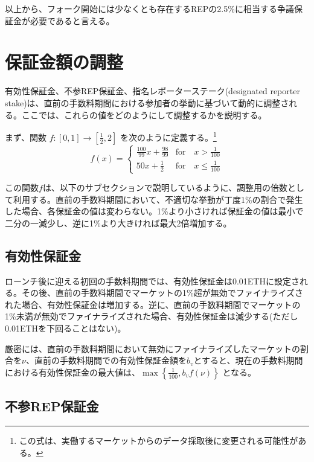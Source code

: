\documentclass[floatfix,reprint,nofootinbib,amsmath,amssymb,epsfig,pre,floats,letterpaper,groupedaffiliation]{revtex4-1}
\newcommand{\beq}{\begin{equation}}
\newcommand{\eeq}{\end{equation}}
\theoremstyle{definition}
\theoremstyle{definition}
\theoremstyle{definition}
\begin{document}
\begin{appendix}
以上から、フォーク開始には少なくとも存在するREPの2.5\%に相当する争議保証金が必要であると言える。

\section{保証金額の調整}\label{section:bond_size_adjustment_details}

有効性保証金、不参REP保証金、指名レポーターステーク(designated reporter stake)は、直前の手数料期間における参加者の挙動に基づいて動的に調整される。ここでは、これらの値をどのようにして調整するかを説明する。

まず、関数 $f: [0, 1] \rightarrow [\frac{1}{2}, 2]$ を次のように定義する。\footnote{この式は、実働するマーケットからのデータ採取後に変更される可能性がある。}
\beq\label{eq:validity_bond_adjustment}
f(x) = \begin{cases} 
\frac{100}{99} x + \frac{98}{99} & \text{for}\quad x > \frac{1}{100} \\
50x + \frac{1}{2} & \text{for}\quad x \leq \frac{1}{100}
\end{cases}
\eeq

この関数$f$は、以下のサブセクションで説明しているように、調整用の倍数として利用する。直前の手数料期間において、不適切な挙動が丁度1\%の割合で発生した場合、各保証金の値は変わらない。1\%より小さければ保証金の値は最小で二分の一減少し、逆に1\%より大きければ最大2倍増加する。

\subsection{有効性保証金}\label{section:bond_size_adjustment_details_validity_bonds}

ローンチ後に迎える初回の手数料期間では、有効性保証金は0.01ETHに設定される。その後、直前の手数料期間でマーケットの1\%超が無効でファイナライズされた場合、有効性保証金は増加する。逆に、直前の手数料期間でマーケットの1\%未満が無効でファイナライズされた場合、有効性保証金は減少する(ただし0.01ETHを下回ることはない)。

厳密には、直前の手数料期間において無効にファイナライズしたマーケットの割合を$\nu$、直前の手数料期間での有効性保証金額を$b_v$とすると、現在の手数料期間における有効性保証金の最大値は、$\max\left\{\frac{1}{100}, b_v f(\nu)\right\}$ となる。

\subsection{不参REP保証金}\label{section:bond_size_adjustment_details_no-show_bonds}


\end{appendix}
\end{document}
